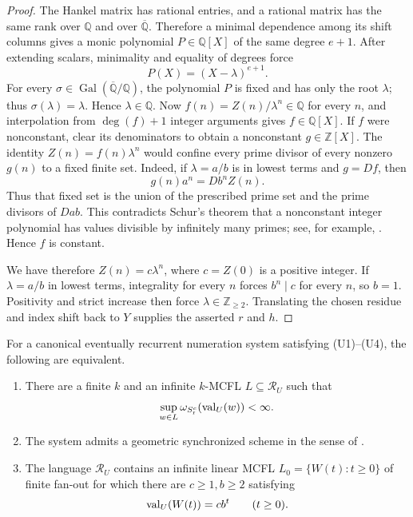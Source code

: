 \begin{proof}
  The Hankel matrix has rational entries, and a rational matrix has the
  same rank over \(\mathbb Q\) and over \(\overline{\mathbb Q}\).
  Therefore a minimal dependence among its shift columns gives a monic
  polynomial \(P\in\mathbb Q[X]\) of the same degree \(e+1\). After
  extending scalars, minimality and equality of degrees force
  \[
    P(X)=(X-\lambda)^{e+1}.
  \]
  For every
  \(\sigma\in\operatorname{Gal}(\overline{\mathbb Q}/\mathbb Q)\), the
  polynomial \(P\) is fixed and has only the root \(\lambda\); thus
  \(\sigma(\lambda)=\lambda\). Hence \(\lambda\in\mathbb Q\). Now
  \(f(n)=Z(n)/\lambda^n\in\mathbb Q\)
  for every \(n\), and interpolation from \(\deg(f)+1\) integer
  arguments gives \(f\in\mathbb Q[X]\). If \(f\) were nonconstant, clear its
  denominators to obtain a nonconstant \(g\in\mathbb Z[X]\). The
  identity \(Z(n)=f(n)\lambda^n\) would confine every prime divisor of
  every nonzero \(g(n)\) to a fixed finite set. Indeed, if
  \(\lambda=a/b\) is in lowest terms and \(g=Df\), then
  \[
    g(n)a^n=Db^nZ(n).
  \]
  Thus that fixed set is the union of the prescribed prime set and the
  prime divisors of \(Dab\). This contradicts Schur's theorem that a
  nonconstant integer polynomial has values divisible by infinitely
  many primes; see, for example, \cite{HardyWright2008}. Hence \(f\) is
  constant.

  We have therefore \(Z(n)=c\lambda^n\), where
  \(c=Z(0)\) is a positive integer. If \(\lambda=a/b\) in lowest terms,
  integrality for every \(n\) forces \(b^n\mid c\) for every \(n\), so
  \(b=1\). Positivity and strict increase then force
  \(\lambda\in\mathbb Z_{\ge2}\). Translating the chosen residue and
  index shift back to \(Y\) supplies the asserted \(r\) and \(h\).
\end{proof}

\begin{theorem}
  \label{thm:bounded-outside-support-geometric-ray}
  For a canonical eventually recurrent numeration system satisfying
  \textup{(U1)--(U4)}, the following are equivalent.
  \begin{enumerate}[label=\textup{(\roman*)}]
    \item There are a finite \(k\) and an infinite \(k\)-MCFL
    \(L\subseteq\mathcal R_U\) such that
    \[
      \sup_{w\in L}\omega_{S_{\mathrm r}^c}(\operatorname{val}_U(w))<\infty.
    \]
    \item The system admits a geometric synchronized scheme in the
    sense of .
    \item The language \(\mathcal R_U\) contains an infinite linear MCFL
    \(L_0=\{W(t):t\ge0\}\) of finite fan-out for which there are
    \(c\ge1,b\ge2\) satisfying
    \[
      \operatorname{val}_U(W(t))=cb^t\qquad(t\ge0).
    \]
  \end{enumerate}
\end{theorem}


